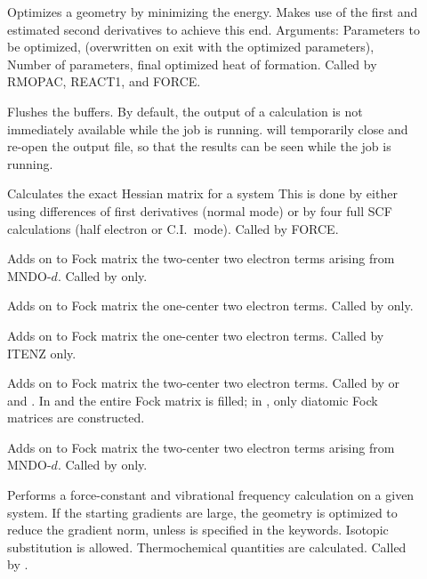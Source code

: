 \begin{description}
\item[] Optimizes a geometry by minimizing the energy. Makes
use of the first and estimated second derivatives to achieve this end. 
Arguments: Parameters to be optimized,  (overwritten on exit with the optimized
parameters), Number of  parameters, final optimized heat of formation. Called
by RMOPAC,  REACT1, and FORCE.

\item[] Flushes the buffers.  By default, the output of a
calculation is not immediately available while the job is running. 
 will temporarily close and re-open the output file, so that the
results can be seen while the job is running.

\item[] Calculates the exact Hessian matrix for a system This is
done by either using differences of first derivatives  (normal mode) or by four
full SCF calculations (half electron  or C.I.\ mode). Called by FORCE.

\item[] Adds on to Fock matrix the two-center two electron terms
arising from MNDO-$d$. Called by  only.

\item[] Adds on to Fock matrix the one-center two electron  terms.
Called by  only.

\item[] Adds on to Fock matrix the one-center two electron  terms.
Called by ITENZ only.

\item[] Adds on to Fock matrix the two-center  two
electron  terms. Called by  or  and .  In
 and  the  entire Fock matrix is filled; in
, only diatomic Fock matrices are  constructed.

\item[] Adds on to Fock matrix the two-center two electron terms
arising from MNDO-$d$. Called by  only.

\item[] Performs a force-constant and vibrational  frequency
calculation on a given system. If the starting  gradients are large, the
geometry is optimized to reduce the  gradient norm, unless  is
specified in the keywords.  Isotopic substitution is allowed. Thermochemical
quantities  are calculated. Called by .


\end{description}
